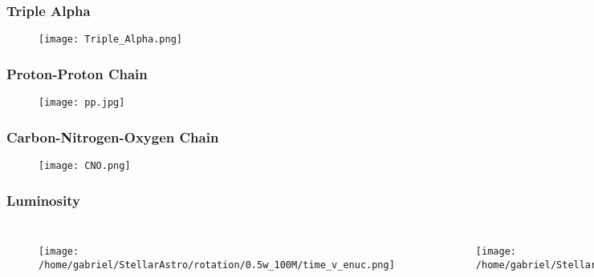 \documentclass{beamer}
\begin{document}

\begin{frame}
	\frametitle{Triple Alpha}
\begin{figure}
    \begin{center}
      \texttt{[image: Triple\_Alpha.png]}
    \end{center}
  \end{figure}

\end{frame}




\begin{frame}
        \frametitle{Proton-Proton Chain}
\begin{figure}
    \begin{center}
      \texttt{[image: pp.jpg]}
    \end{center}
  \end{figure}

\end{frame}


\begin{frame}
        \frametitle{Carbon-Nitrogen-Oxygen Chain}
\begin{figure}
    \begin{center}
      \texttt{[image: CNO.png]}
    \end{center}
  \end{figure}

\end{frame}





\begin{frame}
\frametitle{Luminosity}
        \begin{columns}[c]
\begin{figure}
    \begin{center}
      \texttt{[image: /home/gabriel/StellarAstro/rotation/0.5w\_100M/time\_v\_enuc.png]}
    \end{center}
  \end{figure}

        \begin{figure}
    \begin{center}
      \texttt{[image: /home/gabriel/StellarAstro/rotation/0.9w\_100M/time\_v\_enuc.png]}
    \end{center}
  \end{figure}

        \end{columns}
\end{frame}
\end{document}
